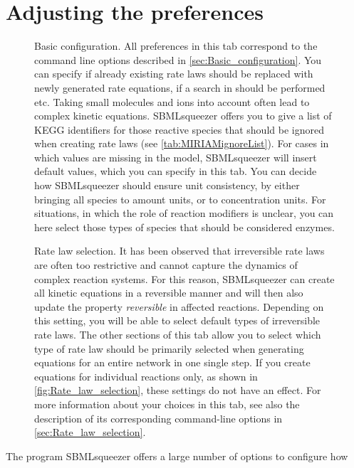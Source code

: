 \section{Adjusting the preferences}
\label{sec:GUIPrefs}
\begin{figure}
\caption[Basic configuration]{Basic configuration.
All preferences %
in this tab correspond to the command line options described in
\vref{sec:Basic_configuration}. You can specify if already existing rate laws
should be replaced with newly generated rate equations, if a search in \SABIO
should be performed etc. %
Taking small molecules and ions into account often lead to complex kinetic equations.
SBMLsqueezer offers you to give a list of KEGG identifiers for those reactive
species that should be ignored when creating rate laws (see \vref{tab:MIRIAMignoreList}).
For cases in which values are missing in the
model, SBMLsqueezer will insert default values, which you can specify in this
tab. %
You can decide how SBMLsqueezer should ensure unit consistency,
by either bringing all species to amount units, or to concentration units.
For situations, in which the role of reaction modifiers is unclear, you
can here select those types of species that should be considered enzymes.}
\label{fig:Basic_Configuration}
\end{figure}
\begin{figure}
\caption[Rate law selection]{Rate law selection.
It has been observed that irreversible rate laws are
often too restrictive and cannot capture the dynamics of complex reaction systems.
For this reason, SBMLsqueezer can create all kinetic equations in a reversible manner
and will then also update the property \emph{reversible} in affected reactions.
Depending on this setting, you will be able to select default types of irreversible
rate laws.
The other sections of this tab allow you to select which type of rate law should
be primarily selected when generating equations for an entire network in one single
step.
If you create equations for individual reactions only, as shown in \vref{fig:Rate_law_selection},
these settings do not have an effect.  
For more information about your choices in this tab, see also the description of
its corresponding command-line options in \vref{sec:Rate_law_selection}.}
\label{fig:Rate_law_selection}
\end{figure}
The program SBMLsqueezer offers a large number of options to configure how
